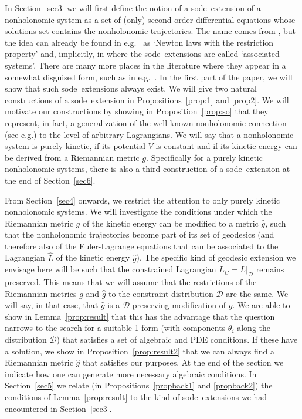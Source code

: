 \documentclass[11pt]{article}
\def\sode{{\sc sode}}
\def\D{{\mathcal D}}
\begin{document}
In Section~\ref{sec3} we will first define the notion of a \sode\ extension  of a nonholonomic system as a set of (only) second-order differential equations whose solutions set contains the nonholonomic trajectories. The name comes from \cite{Simoes}, but the idea can already be found in e.g.\ \cite{BC}  as `Newton laws with the restriction property' and, implicitly, in \cite{BFM} where the \sode\ extensions are called `associated systems'.  {There are many more places in the literature where they appear in a somewhat disguised form, such as in e.g.\ \cite{Fasso}}. In the first part of the paper, we will show that such \sode\ extensions always exist. We will give two natural constructions of a \sode\ extension in Propositions~\ref{prop:1}  and \ref{prop2}. We will motivate our constructions by showing in Proposition~\ref{prop:so} that they represent, in fact, a generalization of  the  well-known nonholonomic connection (see e.g.\cite{Lewis,Cortes}) to the level of arbitrary Lagrangians. We will say that a nonholonomic system is purely kinetic, if its potential $V$ is  constant and if its kinetic energy can be derived from a Riemannian metric $g$. Specifically for a  purely kinetic nonholonomic systems, there is also a third construction of a \sode\ extension at the end of  Section~\ref{sec6}.


From Section~\ref{sec4}  onwards, we restrict the attention to only  purely kinetic nonholonomic systems.  We will investigate the conditions under which the Riemannian metric $g$ of the kinetic energy can be modified to a metric $\hat g$, such that the nonholonomic trajectories become part of its set of  geodesics (and therefore also of the Euler-Lagrange equations that can be associated to the Lagrangian $\hat L$ of the kinetic energy $\hat g$). The specific kind of geodesic extension we envisage here will be such that the  constrained Lagrangian $L_C = L|_\D$ remains preserved. This means that we will assume that the restrictions of the Riemannian metrics $g$ and $\hat g$ to the constraint distribution $\D$ are the same. We will say, in that case, that $\hat g$ is a $\D$-preserving modification of $g$.
  We are able to show in Lemma~\ref{prop:result} that this has the advantage that the question narrows  to the search for a suitable 1-form  (with components $\theta_i$ along the distribution $\D$) that satisfies a set of algebraic and PDE conditions. If these have a solution, we show in Proposition~\ref{prop:result2}  that we can always find  a Riemannian metric $\hat g$ that satisfies our purposes.  At the end of the section we indicate how one can generate more necessary algebraic conditions.  In Section~\ref{sec5} we relate (in Propositions~\ref{propback1} and \ref{propback2}) the conditions of Lemma~\ref{prop:result} to the kind of  \sode\ extensions  we had encountered in Section~\ref{sec3}.
\end{document}
